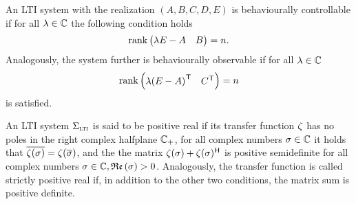 \begin{definition}\label{def:behaviourally-controllable-observable}
    An \ac{LTI} system with the realization $(A, B, C, D, E)$ is behaviourally controllable if for all $\lambda \in \mathbb{C}$ the following condition holds
    \begin{equation}\label{eq:behaviourally-controllable}
        \mathop{}\!\mathrm{rank}\left(\begin{matrix}
            \lambda E - A & B
        \end{matrix}\right) = n.
    \end{equation}
    Analogously, the system further is behaviourally observable if for all $\lambda \in \mathbb{C}$
    \begin{equation}\label{eq:behaviourally-observable}
        \mathop{}\!\mathrm{rank}\left(\begin{matrix}
            \lambda {(E - A)}^{\mkern1mu \mathsf{T}} & C^{\mkern1mu \mathsf{T}}
        \end{matrix}\right) = n
    \end{equation}
    is satisfied.
\end{definition}

\begin{definition}\label{def:positive-real}
    An \ac{LTI} system $\Sigma_{\textnormal{\scshape lti}}$ is said to be positive real if its transfer function $\zeta$ has no poles in the right complex halfplane $\mathbb{C}_+$, for all complex numbers $\sigma \in \mathbb{C}$ it holds that $\overline{\zeta(\sigma)} = \zeta(\overline{\sigma})$, and the the matrix $\zeta(\sigma) + \zeta(\sigma)^{\mkern1mu \mathsf{H}}$ is positive semidefinite for all complex numbers $\sigma \in \mathbb{C}, \mathop{}\!\mathfrak{Re}\left(\sigma\right) > 0$.
    Analogously, the transfer function is called strictly positive real if, in addition to the other two conditions, the matrix sum is positive definite.
\end{definition}

